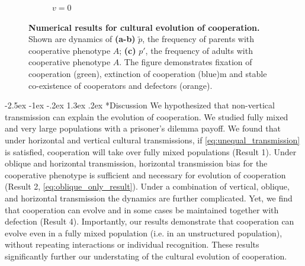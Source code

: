 \documentclass[12pt]{extarticle}
\makeatletter
\renewcommand\section{\@startsection {section}{1}{\z@}%
     {-2.5ex \@plus -1ex \@minus -.2ex}%
     {1.3ex \@plus.2ex}%
    {\Large\bfseries}}
\makeatother
\begin{document}
\begin{figure}[H]
\begin{subfigure}{8cm}
    \caption{$v=0$}
    \label{fig:results_c}
  \end{subfigure}
  \label{fig:results}
  \caption{
  \textbf{Numerical results for cultural evolution of cooperation.}
  Shown are dynamics of \textbf{(a-b)} $\tilde{p}$, the frequency of parents with cooperative phenotype $A$; \textbf{(c)} $p'$, the frequency of adults with cooperative phenotype $A$.
  The figure demonstrates fixation of cooperation (green), extinction of cooperation (blue)m and stable co-existence of cooperators and defectors (orange).
  }
\end{figure}


\section*{Discussion}
We hypothesized that non-vertical transmission can explain the evolution of cooperation.
We studied fully mixed and very large populations with a prisoner's dilemma payoff. 
We found that under horizontal and vertical cultural transmissions, if \autoref{eq:unequal_transmission} is satisfied, cooperation will take over fully mixed populations (Result 1).
Under oblique and horizontal transmission, horizontal transmission bias for the cooperative phenotype is sufficient and necessary for evolution of cooperation (Result 2, \autoref{eq:oblique_only_result}).
Under a combination of vertical, oblique, and horizontal transmission the dynamics are further complicated. Yet, we find that cooperation can evolve and in some cases be maintained together with defection (Result 4). 
Importantly, our results demonstrate that cooperation can evolve even in a fully mixed population (i.e. in an unstructured population), without repeating interactions or individual recognition.
These results significantly further our understating of the cultural evolution of cooperation. 
\end{document}

